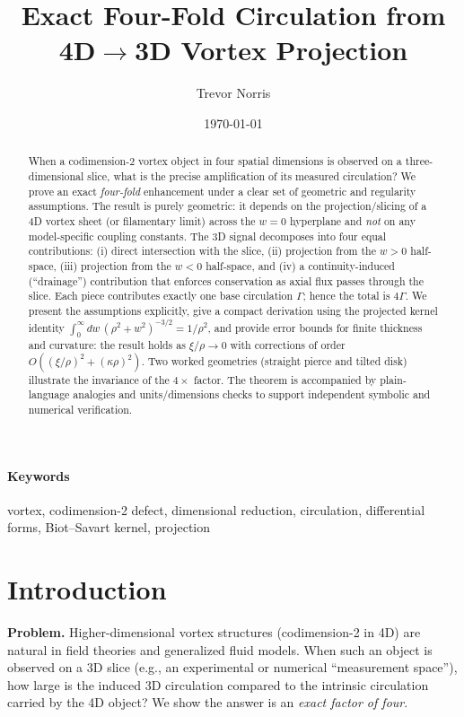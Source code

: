 \documentclass[11pt]{article}
\title{Exact Four-Fold Circulation from 4D$\to$3D Vortex Projection}
\author{Trevor Norris}
\date{\today}
\begin{document}
\maketitle

\begin{abstract}
When a codimension-2 vortex object in four spatial dimensions is observed on a three-dimensional slice, what is the precise amplification of its measured circulation? We prove an exact \emph{four-fold} enhancement under a clear set of geometric and regularity assumptions. The result is purely geometric: it depends on the projection/slicing of a 4D vortex sheet (or filamentary limit) across the $w=0$ hyperplane and \emph{not} on any model-specific coupling constants. The 3D signal decomposes into four equal contributions: (i) direct intersection with the slice, (ii) projection from the $w>0$ half-space, (iii) projection from the $w<0$ half-space, and (iv) a continuity-induced (``drainage'') contribution that enforces conservation as axial flux passes through the slice. Each piece contributes exactly one base circulation $\Gamma$; hence the total is $4\Gamma$. We present the assumptions explicitly, give a compact derivation using the projected kernel identity $\int_0^{\infty}\!dw\,(\rho^2+w^2)^{-3/2}=1/\rho^2$, and provide error bounds for finite thickness and curvature: the result holds as $\xi/\rho\to0$ with corrections of order $O((\xi/\rho)^2+(\kappa\rho)^2)$. Two worked geometries (straight pierce and tilted disk) illustrate the invariance of the $4\times$ factor. The theorem is accompanied by plain-language analogies and units/dimensions checks to support independent symbolic and numerical verification.
\end{abstract}

\paragraph{Keywords} vortex, codimension-2 defect, dimensional reduction, circulation, differential forms, Biot--Savart kernel, projection

\section{Introduction}
\textbf{Problem.} Higher-dimensional vortex structures (codimension-2 in 4D) are natural in field theories and generalized fluid models. When such an object is observed on a 3D slice (e.g., an experimental or numerical ``measurement space''), how large is the induced 3D circulation compared to the intrinsic circulation carried by the 4D object? We show the answer is an \textit{exact factor of four}.
\end{document}

